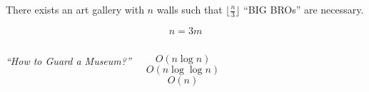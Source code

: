 \begin{frame}{}
  \begin{theorem}
    There exists an art gallery with $n$ walls such that $\lfloor \frac{n}{3} \rfloor$ ``BIG BROs'' are necessary.
  \end{theorem}

  \pause
  \vspace{0.80cm}

  \[
    n = 3m
  \]
\end{frame}

\begin{frame}{}
  \begin{columns}
      \centerline{{\it ``How to Guard a Museum?''}}
      \pause
      \[
	O(n \log n) 
      \]
      \[
	O(n \log \log n)
      \]
      \[
	O(n)
      \]
  \end{columns}
\end{frame}
